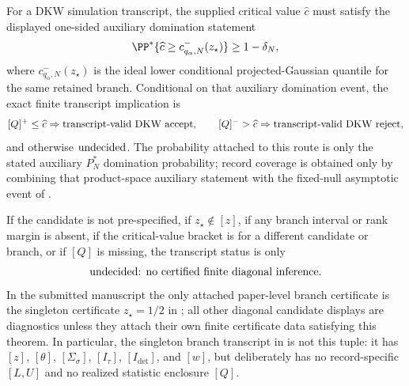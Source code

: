 \begin{algorithmiclemma}
For a DKW simulation transcript, the supplied critical value \(\widehat c\)
must satisfy the displayed one-sided auxiliary domination statement
\[
\PP^\ast\{\widehat c\ge c^{-}_{q_\alpha,N}(z_\star)\}\ge1-\delta_N,
\]
where \(c^{-}_{q_\alpha,N}(z_\star)\) is the ideal lower conditional
projected-Gaussian quantile for the same retained branch.  Conditional on that
auxiliary domination event, the exact finite transcript implication is
\[
[Q]^+\le\widehat c\Rightarrow\text{\rm transcript-valid DKW accept},\qquad
[Q]^->\widehat c\Rightarrow\text{\rm transcript-valid DKW reject},
\]
and otherwise \(\text{\rm undecided}\).  The probability attached to this
route is only the stated auxiliary \(P_N^\ast\) domination probability; record
coverage is obtained only by combining that product-space auxiliary statement
with the fixed-null asymptotic event of
.

If the candidate is not pre-specified, if \(z_\star\notin[z]\), if any branch
interval or rank margin is absent, if the critical-value bracket is for a
different candidate or branch, or if \([Q]\) is missing, the transcript status
is only
\[
\text{\rm undecided: no certified finite diagonal inference}.
\]
In the submitted manuscript the only attached paper-level branch certificate
is the singleton certificate \(z_\star=1/2\) in
; all other diagonal
candidate displays are diagnostics unless they attach their own finite
certificate data satisfying this theorem.  In particular, the singleton
branch transcript in
 is not this tuple:
it has \([z]\), \([\theta]\), \([\Sigma_\sigma]\), \([I_\tau]\),
\([I_{\det}]\), and \([w]\), but deliberately has no record-specific
\([L,U]\) and no realized statistic enclosure \([Q]\).
\end{algorithmiclemma}

